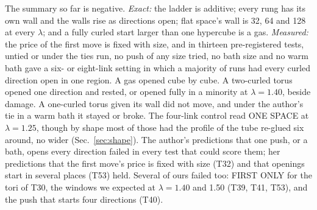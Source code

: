 \documentclass[aps,pre,10pt,twocolumn,superscriptaddress,nofootinbib]{revtex4-2}
\begin{document}
The summary so far is negative. \emph{Exact:} the ladder is additive; every rung has its own wall and the walls
rise as directions open; flat space's wall is 32, 64 and 128 at every $\lambda$; and a fully curled start larger than
one hypercube is a gas. \emph{Measured:} the price of the first move is fixed with size, and in thirteen
pre-registered tests, untied or under the ties run, no push of any size tried, no bath size and no warm bath gave a
six- or eight-link setting in which a majority of runs had every curled direction open in one region. A gas opened
cube by cube. A two-curled torus opened one direction and rested, or opened fully in a minority at $\lambda = 1.40$,
beside damage. A one-curled torus given its wall did not move, and under the author's tie in a warm bath it stayed or
broke. The four-link control read ONE SPACE at $\lambda = 1.25$, though by shape most of those had the profile of the tube
re-glued six around, no wider (Sec.~\ref{sec:shape}). The author's predictions that one push, or a bath, opens every direction failed in every test that
could score them; her
predictions that the first move's price is fixed with size (T32) and that openings start in several places (T53)
held. Several of ours failed too: FIRST ONLY for the tori of T30, the windows we expected at $\lambda = 1.40$ and
1.50 (T39, T41, T53), and the push that starts four directions (T40).
\end{document}
